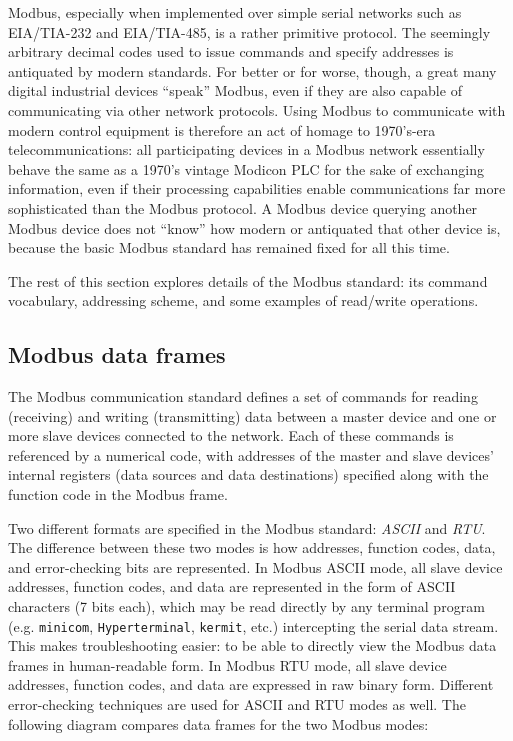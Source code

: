\vskip 10pt

\filbreak

Modbus, especially when implemented over simple serial networks such as EIA/TIA-232 and EIA/TIA-485, is a rather primitive protocol.  The seemingly arbitrary decimal codes used to issue commands and specify addresses is antiquated by modern standards.  For better or for worse, though, a great many digital industrial devices ``speak'' Modbus, even if they are also capable of communicating via other network protocols.  Using Modbus to communicate with modern control equipment is therefore an act of homage to 1970's-era telecommunications: all participating devices in a Modbus network essentially behave the same as a 1970's vintage Modicon PLC for the sake of exchanging information, even if their processing capabilities enable communications far more sophisticated than the Modbus protocol.  A Modbus device querying another Modbus device does not ``know'' how modern or antiquated that other device is, because the basic Modbus standard has remained fixed for all this time.  

\vskip 10pt

The rest of this section explores details of the Modbus standard: its command vocabulary, addressing scheme, and some examples of read/write operations.









\filbreak
\subsection{Modbus data frames}

The Modbus communication standard defines a set of commands for reading (receiving) and writing (transmitting) data between a master device and one or more slave devices connected to the network.  Each of these commands is referenced by a numerical code, with addresses of the master and slave devices' internal registers (data sources and data destinations) specified along with the function code in the Modbus frame.

Two different formats are specified in the Modbus standard: \textit{ASCII} and \textit{RTU}.  The difference between these two modes is how addresses, function codes, data, and error-checking bits are represented.  In Modbus ASCII mode, all slave device addresses, function codes, and data are represented in the form of ASCII characters (7 bits each), which may be read directly by any terminal program (e.g. \texttt{minicom}, \texttt{Hyperterminal}, \texttt{kermit}, etc.) intercepting the serial data stream.  This makes troubleshooting easier: to be able to directly view the Modbus data frames in human-readable form.  In Modbus RTU mode, all slave device addresses, function codes, and data are expressed in raw binary form.  Different error-checking techniques are used for ASCII and RTU modes as well.  The following diagram compares data frames for the two Modbus modes:       

